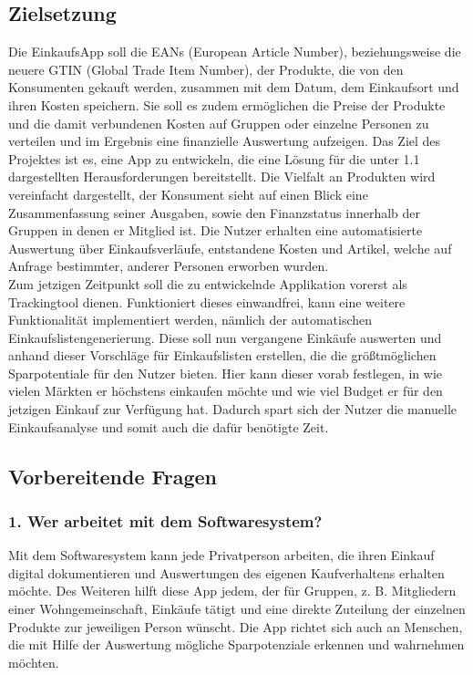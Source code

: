 \documentclass[12pt,a4paper]{article}
\begin{document}
\subsection{Zielsetzung}
Die EinkaufsApp soll die EANs (European Article Number), beziehungsweise die neuere GTIN (Global Trade Item Number), der Produkte, die von den Konsumenten gekauft werden, zusammen mit dem Datum, dem Einkaufsort und ihren Kosten speichern.
Sie soll es zudem ermöglichen die Preise der Produkte und die damit verbundenen Kosten auf Gruppen oder einzelne Personen zu verteilen und im Ergebnis eine finanzielle Auswertung aufzeigen.
Das Ziel des Projektes ist es, eine App zu entwickeln, die eine Lösung für die unter 1.1 dargestellten Herausforderungen bereitstellt. 
Die Vielfalt an Produkten wird vereinfacht dargestellt, der Konsument sieht auf einen Blick eine Zusammenfassung seiner Ausgaben, sowie den Finanzstatus innerhalb der Gruppen in denen er Mitglied ist. Die Nutzer erhalten eine automatisierte Auswertung über Einkaufsverläufe, entstandene Kosten und Artikel, welche auf Anfrage bestimmter, anderer Personen erworben wurden.
\\
Zum jetzigen Zeitpunkt soll die zu entwickelnde Applikation vorerst als Trackingtool dienen. Funktioniert dieses einwandfrei, kann eine weitere Funktionalität implementiert werden, nämlich der automatischen Einkaufslistengenerierung. Diese soll nun vergangene Einkäufe auswerten und anhand dieser Vorschläge für Einkaufslisten erstellen, die die größtmöglichen Sparpotentiale für den Nutzer bieten. Hier kann dieser vorab festlegen, in wie vielen Märkten er höchstens einkaufen möchte und wie viel Budget er für den jetzigen Einkauf zur Verfügung hat. Dadurch spart sich der Nutzer die manuelle Einkaufsanalyse und somit auch die dafür benötigte Zeit.

\newpage
\subsection{Vorbereitende Fragen}
\subsubsection*{1. Wer arbeitet mit dem Softwaresystem?}
Mit dem Softwaresystem kann jede Privatperson arbeiten, die ihren Einkauf digital dokumentieren und Auswertungen des eigenen Kaufverhaltens erhalten möchte. 
Des Weiteren hilft diese App jedem, der für Gruppen, z. B. Mitgliedern einer Wohngemeinschaft, Einkäufe tätigt und eine direkte Zuteilung der einzelnen Produkte zur jeweiligen Person wünscht. 
Die App richtet sich auch an Menschen, die mit Hilfe der Auswertung mögliche Sparpotenziale erkennen und wahrnehmen möchten. 
\\
\end{document}
